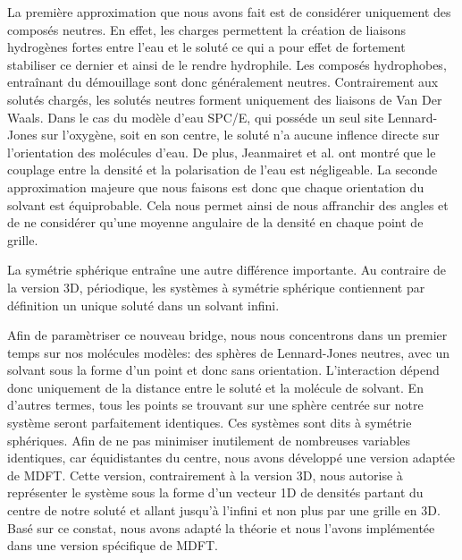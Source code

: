 La première approximation que nous avons fait est de considérer uniquement des composés neutres.
En effet, les charges permettent la création de liaisons hydrogènes fortes entre l'eau et le soluté ce qui a pour effet de fortement stabiliser ce dernier et ainsi de le rendre hydrophile.
Les composés hydrophobes, entraînant du démouillage sont donc généralement neutres.
Contrairement aux solutés chargés, les solutés neutres forment uniquement des liaisons de Van Der Waals.
Dans le cas du modèle d'eau SPC/E, qui posséde un seul site Lennard-Jones sur l'oxygène, soit en son centre, le soluté n'a aucune inflence directe sur l'orientation des molécules d'eau.
De plus, Jeanmairet et al.\cite{jeanmairet_molecular_2013, jeanmairet_molecular_2016} ont montré que le couplage entre la densité et la polarisation de l'eau est négligeable.
La seconde approximation majeure que nous faisons est donc que chaque orientation du solvant est équiprobable. Cela nous permet ainsi de nous affranchir des angles et de ne considérer qu'une moyenne angulaire de la densité en chaque point de grille.

La symétrie sphérique entraîne une autre différence importante. Au contraire de la version 3D, périodique, les systèmes à symétrie sphérique contiennent par définition un unique soluté dans un solvant infini.

Afin de paramètriser ce nouveau bridge, nous nous concentrons dans un premier temps sur nos molécules modèles: des sphères de Lennard-Jones neutres, avec un solvant sous la forme d'un point et donc sans orientation. L’interaction dépend donc uniquement de la distance entre le soluté et la molécule de solvant. En d'autres termes, tous les points se trouvant sur une sphère centrée sur notre système seront parfaitement identiques. Ces systèmes sont dits à symétrie sphériques. Afin de ne pas minimiser inutilement de nombreuses variables identiques, car équidistantes du centre, nous avons développé une version adaptée de MDFT. Cette version, contrairement à la version 3D, nous autorise à représenter le système sous la forme d'un vecteur 1D de densités partant du centre de notre soluté et allant jusqu'à l'infini et non plus par une grille en 3D. Basé sur ce constat, nous avons adapté la théorie et nous l'avons implémentée dans une version spécifique de MDFT.



